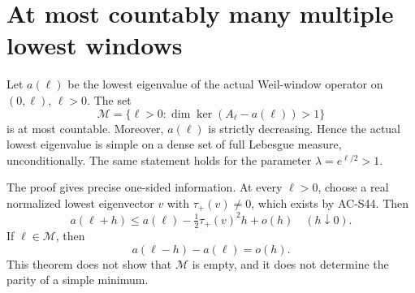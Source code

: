 \section{At most countably many multiple lowest windows}
\label{sec:spectral-generic-simplicity}

\begin{theorem}
\label{AC-S45}
Let \(a(\ell)\) be the lowest eigenvalue of the actual
Weil-window operator on \((0,\ell)\), \(\ell>0\).
The set
\[
 \mathcal M=\{\ell>0:\dim\ker(A_\ell-a(\ell))>1\}
                                                               \tag{GS.1}
\]
is at most countable.  Moreover, \(a(\ell)\) is strictly decreasing.
Hence the actual lowest eigenvalue is
simple on a dense set of full Lebesgue measure, unconditionally.
The same statement holds for the parameter
\(\lambda=e^{\ell/2}>1\).

The proof gives precise one-sided information.  At every
\(\ell>0\), choose a real normalized lowest eigenvector
\(v\) with \(\tau_+(v)\ne0\), which exists by AC-S44.
Then
\[
 a(\ell+h)\leq a(\ell)-\tfrac12\tau_+(v)^2h+o(h)
                                      \quad(h\downarrow0).
                                                               \tag{GS.2}
\]
If \(\ell\in\mathcal M\), then
\[
                   a(\ell-h)-a(\ell)=o(h).               \tag{GS.3}
\]
This theorem does not show that \(\mathcal M\) is empty,
and it does not determine the parity of a simple minimum.
\end{theorem}
